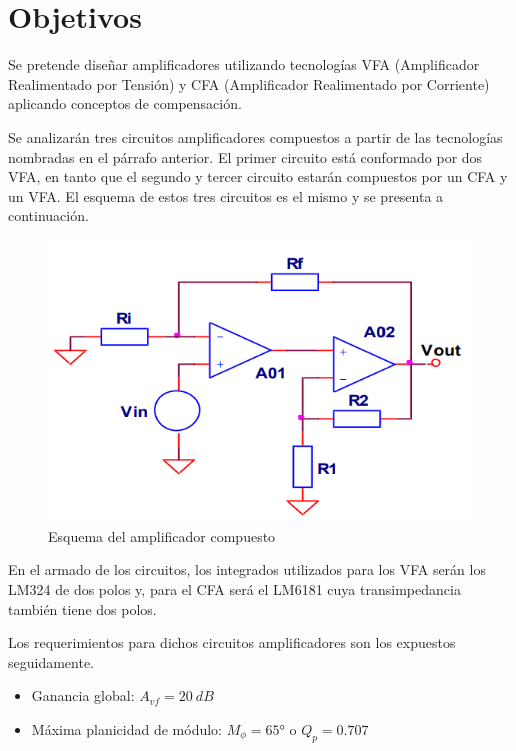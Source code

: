 \documentclass[12pt,A4paper,titlepage]{article}
\begin{document}
\newpage
\tableofcontents %

\newpage

\section{Objetivos}
\hspace{1mm} Se pretende diseñar amplificadores utilizando tecnologías VFA (Amplificador Realimentado por Tensión) y CFA (Amplificador Realimentado por Corriente) aplicando conceptos de compensación.

\bigskip
\hspace{1mm} Se analizarán tres circuitos amplificadores compuestos a partir de las tecnologías nombradas en el párrafo anterior. El primer circuito está conformado por dos VFA, en tanto que el segundo y tercer circuito estarán compuestos por un CFA y un VFA. El esquema de estos tres circuitos es el mismo y se presenta a continuación.

\begin{figure}[!h]
    \centering
    \includegraphics[scale=0.7]{Objetivos.png}
    \caption{Esquema del amplificador compuesto}
\end{figure}

\hspace{1mm} En el armado de los circuitos, los integrados utilizados para los VFA serán los LM324 de dos polos y, para el CFA será el LM6181 cuya transimpedancia también tiene dos polos. 

\bigskip
\hspace{1mm} Los requerimientos para dichos circuitos amplificadores son los expuestos seguidamente.
\begin{itemize}[itemsep=1pt]
    \item Ganancia global: \(A_{vf} = 20~dB\)
    \item Máxima planicidad de módulo: \(M_{\phi}=65°\) o \(Q_p=0.707\)
\end{itemize}
\end{document}
